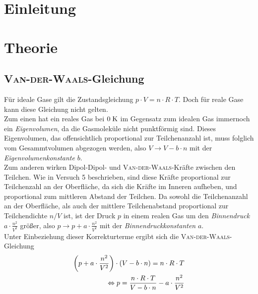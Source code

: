 \documentclass[12pt, a4paper, twoside]{scrartcl}
\newcommand{\person}[1]{\textsc{#1}}
\begin{document}

\cleardoublepage
\tableofcontents
\cleardoublepage
\setcounter{page}{1}

\section{Einleitung}


\section{Theorie}
\label{sec:theorie}
\subsection{\person{Van-der-Waals}-Gleichung}
Für ideale Gase gilt die Zustandsgleichung $p\cdot V = n\cdot R\cdot T$.
Doch für reale Gase kann diese Gleichung nicht gelten. \\
Zum einen hat ein reales Gas bei $0\kelvin$ im Gegensatz zum idealen Gas immernoch ein \textit{Eigenvolumen}, da die Gasmoleküle nicht punktförmig sind.
Dieses Eigenvolumen, das offensichtlich proportional zur Teilchenanzahl ist, muss folglich vom Gesammtvolumen abgezogen werden, also $V \rightarrow V-b\cdot n$ mit der \textit{Eigenvolumenkonstante} $b$.
\\
Zum anderen wirken Dipol-Dipol- und \person{Van-der-Waals}-Kräfte zwischen den Teilchen.
Wie in Versuch 5 beschrieben, sind diese Kräfte proportional zur Teilchenzahl an der Oberfläche, da sich die Kräfte im Inneren aufheben, und proportional zum mittleren Abstand der Teilchen.
Da sowohl die Teilchenanzahl an der Oberfläche, als auch der mittlere Teilchenabstand proportional zur Teilchendichte $n/V$ ist, ist der Druck $p$ in einem realen Gas um den \textit{Binnendruck} $a\cdot \frac{n^2}{V^2}$ größer, also $p \rightarrow p + a\cdot \frac{n^2}{V^2}$ mit der \textit{Binnendruckkonstanten} $a$.
\\
Unter Einbeziehung dieser Korrekturterme ergibt sich die \person{Van-der-Waals}-Gleichung
\begin{align}
 \left(p+a\cdot \frac{n^2}{V^2}\right) \cdot \left(V-b\cdot n\right) = n\cdot R\cdot T \label{VdW_Gleichung} \\
\equals 
 p = \frac{n\cdot R\cdot T}{V-b\cdot n}-a\cdot \frac{n^2}{V^2}\nn
\end{align}
\end{document}
